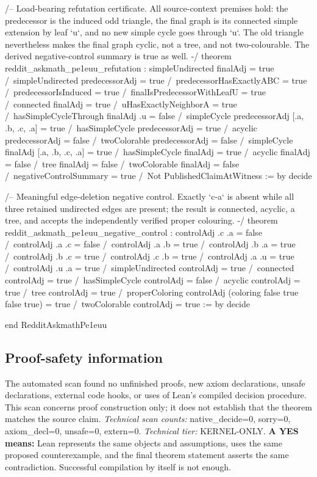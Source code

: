 \documentclass[11pt]{article}
\begin{document}
\begin{Vlean}
/-- Load-bearing refutation certificate.  All source-context premises hold:
the predecessor is the induced odd triangle, the final graph is its connected
simple extension by leaf `u`, and no new simple cycle goes through `u`.  The
old triangle nevertheless makes the final graph cyclic, not a tree, and not
two-colourable.  The derived negative-control summary is true as well. -/
theorem reddit_askmath_pe1euu_refutation :
    simpleUndirected finalAdj = true /\
    simpleUndirected predecessorAdj = true /\
    predecessorHasExactlyABC = true /\
    predecessorIsInduced = true /\
    finalIsPredecessorWithLeafU = true /\
    connected finalAdj = true /\
    uHasExactlyNeighborA = true /\
    hasSimpleCycleThrough finalAdj .u = false /\
    simpleCycle predecessorAdj [.a, .b, .c, .a] = true /\
    hasSimpleCycle predecessorAdj = true /\
    acyclic predecessorAdj = false /\
    twoColorable predecessorAdj = false /\
    simpleCycle finalAdj [.a, .b, .c, .a] = true /\
    hasSimpleCycle finalAdj = true /\
    acyclic finalAdj = false /\
    tree finalAdj = false /\
    twoColorable finalAdj = false /\
    negativeControlSummary = true /\
    Not PublishedClaimAtWitness := by
  decide

/-- Meaningful edge-deletion negative control.  Exactly `c-a` is absent while
all three retained undirected edges are present; the result is connected,
acyclic, a tree, and accepts the independently verified proper colouring. -/
theorem reddit_askmath_pe1euu_negative_control :
    controlAdj .c .a = false /\
    controlAdj .a .c = false /\
    controlAdj .a .b = true /\ controlAdj .b .a = true /\
    controlAdj .b .c = true /\ controlAdj .c .b = true /\
    controlAdj .a .u = true /\ controlAdj .u .a = true /\
    simpleUndirected controlAdj = true /\
    connected controlAdj = true /\
    hasSimpleCycle controlAdj = false /\
    acyclic controlAdj = true /\
    tree controlAdj = true /\
    properColoring controlAdj (coloring false true false true) = true /\
    twoColorable controlAdj = true := by
  decide

end RedditAskmathPe1euu

\end{Vlean}
\subsection*{Proof-safety information}
The automated scan found no unfinished proofs, new axiom declarations, unsafe declarations, external code hooks, or uses of Lean's compiled decision procedure. This scan concerns proof construction only; it does not establish that the theorem matches the source claim.
\textit{Technical scan counts:} native\_decide=0, sorry=0, axiom\_decl=0, unsafe=0, extern=0. \textit{Technical tier:} KERNEL-ONLY.
\textbf{A YES means:} Lean represents the same objects and assumptions, uses the same proposed counterexample, and the final theorem statement asserts the same contradiction. Successful compilation by itself is not enough.
\clearpage
\end{document}
